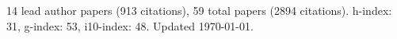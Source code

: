 14 lead author papers (913 citations),
59 total papers (2894 citations).\newline
h-index: 31, g-index: 53, i10-index: 48. Updated \today.